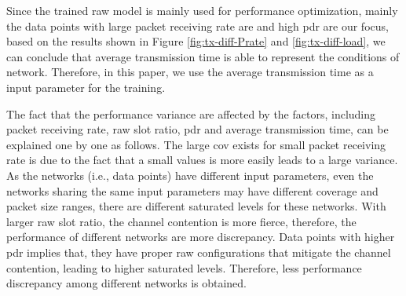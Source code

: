 



 
Since the trained \gls{raw} model is mainly used for performance optimization, mainly the data points with large packet receiving rate are and high \gls{pdr} are our focus, 
based on the results shown in Figure \ref{fig:tx-diff-Prate} and \ref{fig:tx-diff-load}, we can conclude that  average transmission time is able to represent the conditions of network. Therefore, in this paper, we use the average transmission time as a input parameter for the training.
 
 
 The fact that the performance variance are affected by the factors, including packet receiving rate, \gls{raw} slot ratio, \gls{pdr} and average transmission time, can be explained one by one as follows. The large \gls{cov} exists for small packet receiving rate is due to the fact that a small values is more easily leads to a large variance. As the networks (i.e., data points) have different input parameters, even the networks sharing the same input parameters may have different coverage and packet size ranges, there are different saturated levels for these networks. With larger \gls{raw} slot ratio, the channel contention is more fierce, therefore, the performance of different networks are more discrepancy. Data points with higher \gls{pdr} implies that, they have proper \gls{raw} configurations that mitigate the channel contention, leading to higher saturated levels. Therefore, less performance discrepancy among different networks is obtained. 


